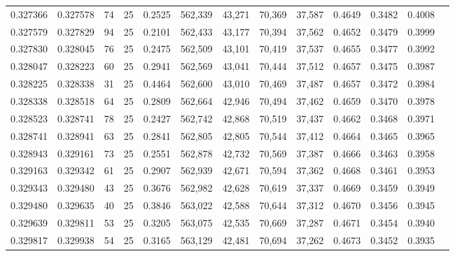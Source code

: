 \begin{tabular}{rrrrrrrrrrrrr}
0.327366 & 0.327578 &    74 &  25 &                                     0.2525 & 562,339 &  43,271 &  70,369 &  37,587 & 0.4649 & 0.3482 & 0.4008 \\
0.327579 & 0.327829 &    94 &  25 &                                     0.2101 & 562,433 &  43,177 &  70,394 &  37,562 & 0.4652 & 0.3479 & 0.3999 \\
0.327830 & 0.328045 &    76 &  25 &                                     0.2475 & 562,509 &  43,101 &  70,419 &  37,537 & 0.4655 & 0.3477 & 0.3992 \\
0.328047 & 0.328223 &    60 &  25 &                                     0.2941 & 562,569 &  43,041 &  70,444 &  37,512 & 0.4657 & 0.3475 & 0.3987 \\
0.328225 & 0.328338 &    31 &  25 &                                     0.4464 & 562,600 &  43,010 &  70,469 &  37,487 & 0.4657 & 0.3472 & 0.3984 \\
0.328338 & 0.328518 &    64 &  25 &                                     0.2809 & 562,664 &  42,946 &  70,494 &  37,462 & 0.4659 & 0.3470 & 0.3978 \\
0.328523 & 0.328741 &    78 &  25 &                                     0.2427 & 562,742 &  42,868 &  70,519 &  37,437 & 0.4662 & 0.3468 & 0.3971 \\
0.328741 & 0.328941 &    63 &  25 &                                     0.2841 & 562,805 &  42,805 &  70,544 &  37,412 & 0.4664 & 0.3465 & 0.3965 \\
0.328943 & 0.329161 &    73 &  25 &                                     0.2551 & 562,878 &  42,732 &  70,569 &  37,387 & 0.4666 & 0.3463 & 0.3958 \\
0.329163 & 0.329342 &    61 &  25 &                                     0.2907 & 562,939 &  42,671 &  70,594 &  37,362 & 0.4668 & 0.3461 & 0.3953 \\
0.329343 & 0.329480 &    43 &  25 &                                     0.3676 & 562,982 &  42,628 &  70,619 &  37,337 & 0.4669 & 0.3459 & 0.3949 \\
0.329480 & 0.329635 &    40 &  25 &                                     0.3846 & 563,022 &  42,588 &  70,644 &  37,312 & 0.4670 & 0.3456 & 0.3945 \\
0.329639 & 0.329811 &    53 &  25 &                                     0.3205 & 563,075 &  42,535 &  70,669 &  37,287 & 0.4671 & 0.3454 & 0.3940 \\
0.329817 & 0.329938 &    54 &  25 &                                     0.3165 & 563,129 &  42,481 &  70,694 &  37,262 & 0.4673 & 0.3452 & 0.3935 \\

\end{tabular}
